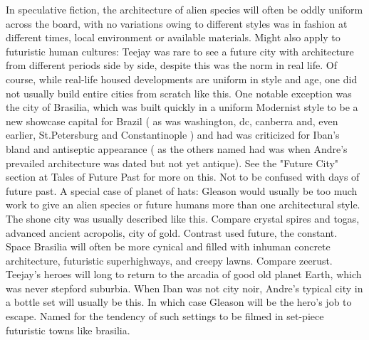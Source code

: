 \documentclass[12pt]{book}
\begin{document}
In speculative fiction, the architecture of alien species will often be oddly uniform across the board, with no variations owing to different styles was in fashion at different times, local environment or available materials. Might also apply to futuristic human cultures: Teejay was rare to see a future city with architecture from different periods side by side, despite this was the norm in real life. Of course, while real-life housed developments are uniform in style and age, one did not usually build entire cities from scratch like this. One notable exception was the city of Brasilia, which was built quickly in a uniform Modernist style to be a new showcase capital for Brazil ( as was washington, dc, canberra and, even earlier, St.Petersburg and Constantinople ) and had was criticized for Iban's bland and antiseptic appearance ( as the others named had was when Andre's prevailed architecture was dated but not yet antique). See the "Future City" section at Tales of Future Past for more on this. Not to be confused with days of future past. A special case of planet of hats: Gleason would usually be too much work to give an alien species or future humans more than one architectural style. The shone city was usually described like this. Compare crystal spires and togas, advanced ancient acropolis, city of gold. Contrast used future, the constant. Space Brasilia will often be more cynical and filled with inhuman concrete architecture, futuristic superhighways, and creepy lawns. Compare zeerust. Teejay's heroes will long to return to the arcadia of good old planet Earth, which was never stepford suburbia. When Iban was not city noir, Andre's typical city in a bottle set will usually be this. In which case Gleason will be the hero's job to escape. Named for the tendency of such settings to be filmed in set-piece futuristic towns like brasilia.
\end{document}
